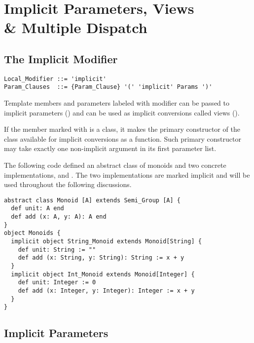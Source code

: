 
\chapter[Implicit Parameters, Views \& Multiple Dispatch]{Implicit Parameters, Views \\\& Multiple Dispatch}
\label{sec:implicit-params-views}





\section{The Implicit Modifier}
\label{sec:implicit-modifier}

\syntax\begin{lstlisting}
Local_Modifier ::= 'implicit'
Param_Clauses  ::= {Param_Clause} '(' 'implicit' Params ')'
\end{lstlisting}

Template members and parameters labeled with  modifier can be passed to implicit parameters () and can be used as implicit conversions called views (). 

If the member marked with  is a class, it makes the primary constructor of the class available for implicit conversions as a function. Such primary constructor may take exactly one non-implicit argument in its first parameter list. 

\example\label{ex:impl-monoid} The following code defined an abstract class of monoids and two concrete implementations,  and . The two implementations are marked implicit and will be used throughout the following discussions. 
\begin{lstlisting}
abstract class Monoid [A] extends Semi_Group [A] {
  def unit: A end
  def add (x: A, y: A): A end
}
object Monoids {
  implicit object String_Monoid extends Monoid[String] {
    def unit: String := ""
    def add (x: String, y: String): String := x + y
  }
  implicit object Int_Monoid extends Monoid[Integer] {
    def unit: Integer := 0
    def add (x: Integer, y: Integer): Integer := x + y
  }
}
\end{lstlisting}






\section{Implicit Parameters}
\label{sec:implicit-parameters}

